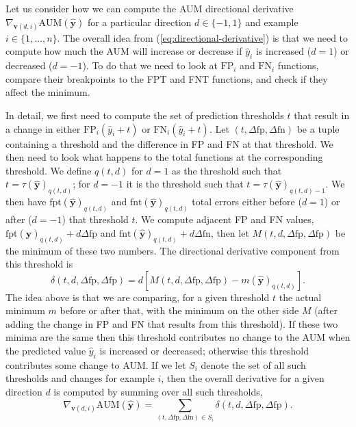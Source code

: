 \documentclass{article}
\begin{document}
Let us consider how we can compute the AUM directional derivative $\nabla_{\mathbf v(d,i)}\text{AUM}(\mathbf{\hat y})$ for a particular direction $d\in\{-1,1\}$ and example $i\in\{1,\dots,n\}$.
The overall idea from (\ref{eq:directional-derivative}) is that we need to compute how much the AUM will increase or decrease if $\hat y_i$ is increased ($d=1$) or decreased ($d=-1$).
To do that we need to look at $\text{FP}_i$ and $\text{FN}_i$ functions, compare their breakpoints to the FPT and FNT functions, and check if they affect the minimum.

In detail, we first need to compute the set of prediction thresholds $t$ that result in a change in either $\text{FP}_i(\hat y_i + t)$ or $\text{FN}_i(\hat y_i + t)$.
Let $(t, \Delta \text{fp}, \Delta\text{fn})$ be a tuple containing a threshold and the difference in FP and FN at that threshold.
We then need to look what happens to the total functions at the corresponding threshold.
We define $q(t,d)$ for $d=1$ as the threshold such that $t=\tau(\mathbf{\hat y})_{q(t,d)}$; for $d=-1$ it is the threshold such that $t=\tau(\mathbf{\hat y})_{q(t,d)-1}$.
We then have $\text{fpt}(\mathbf{\hat y})_{q(t,d)}$ and $\text{fnt}(\mathbf{\hat y})_{q(t,d)}$ total errors either before ($d=1$) or after ($d=-1$) that threshold $t$.
We compute adjacent FP and FN values, 
$\text{fpt}(\mathbf{\hat y})_{q(t,d)}+d \Delta \text{fp}$ and
$\text{fnt}(\mathbf{\hat y})_{q(t,d)}+d \Delta \text{fn}$,
then let $M(t,d,\Delta \text{fp}, \Delta \text{fp})$ be the minimum of these two numbers.
The directional derivative component from this threshold is
\begin{equation}
  \delta(t,d,\Delta \text{fp}, \Delta \text{fp})
  = 
  d\left[ 
   M(t,d,\Delta \text{fp}, \Delta \text{fp}) - 
   m(\mathbf{\hat y})_{q(t,d)} 
   \right].
\end{equation}
The idea above is that we are comparing, for a given threshold $t$ the actual minimum $m$ before or after that, with the minimum on the other side $M$ (after adding the change in FP and FN that results from this threshold).
If these two minima are the same then this threshold contributes no change to the AUM when the predicted value $\hat y_i$ is increased or decreased; otherwise this threshold contributes some change to AUM.
If we let $S_i$ denote the set of all such thresholds and changes for example $i$, then the overall derivative for a given direction $d$ is computed by summing over all such thresholds,
\begin{equation}
    \nabla_{\mathbf v(d,i)}\text{AUM}(\mathbf{\hat y}) =
    \sum_{
    (t, \Delta \text{fp}, \Delta\text{fn}) \in S_i
    }
    \delta(t,d,\Delta \text{fp}, \Delta \text{fp}).
\end{equation}
\end{document}
